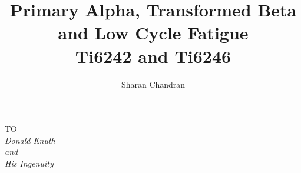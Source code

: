 \makeatletter %
\makeatother %
\begin{frontmatter}

\title{Primary Alpha, Transformed Beta and Low Cycle Fatigue\\ 
	   Ti6242 and Ti6246\\
	}
\author{Sharan Chandran}
\enggfaculty
\iisclogotrue %
\tablespagetrue %
\maketitle


\begin{dedication}
\begin{center}
TO \\[2em]
\large\it Donald Knuth\\
and\\
\large\it His Ingenuity 
\end{center}
\end{dedication}
\acknowledgements


\end{frontmatter}
